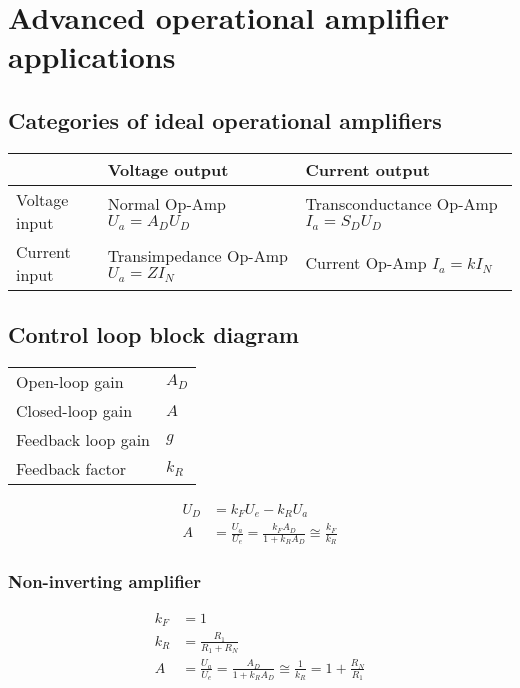 \clearpage
\section{Advanced operational amplifier applications}

\subsection{Categories of ideal operational amplifiers}
\begin{table}[htbp]
	\centering
	\begin{tabularx}{0.9\linewidth}{lXX} \toprule
		& Voltage output & Current output \\ \midrule
		Voltage input & Normal Op-Amp \newline $U_a = A_D U_D$ & Transconductance Op-Amp \newline $I_a = S_D U_D$ \\
		Current input & Transimpedance Op-Amp \newline $U_a = Z I_N$ & Current Op-Amp \newline $I_a = k I_N$ \\ \bottomrule
	\end{tabularx}
\end{table}


\subsection{Control loop block diagram}

\begin{table}[htbp]
	\centering
	\begin{tabular}{ll}
		Open-loop gain & $A_D$ \\
		Closed-loop gain & $A$ \\
		Feedback loop gain & $g$ \\
		Feedback factor & $k_R$ \\
	\end{tabular}
\end{table}

\begin{align}
	U_D &= k_F U_e - k_R U_a \\
	A &= \frac{U_a}{U_e} = \frac{k_F A_D}{1 + k_R A_D} \cong \frac{k_F}{k_R}
\end{align}

\subsubsection{Non-inverting amplifier}
\begin{align}
	k_F &= 1 \\
	k_R &= \frac{R_1}{R_1 + R_N} \\
	A &= \frac{U_a}{U_e} = \frac{A_D}{1 + k_R A_D} \cong \frac{1}{k_R} = 1 + \frac{R_N}{R_1}
\end{align}


